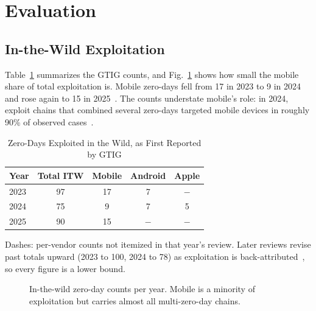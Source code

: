 \documentclass[conference,a4paper]{IEEEtran}
\begin{document}
\section{Evaluation}

\subsection{In-the-Wild Exploitation}
Table~\ref{tab:itw} summarizes the GTIG counts, and Fig.~\ref{fig:itw}
shows how small the mobile share of total exploitation is. Mobile
zero-days fell from 17 in 2023 to 9 in 2024 and rose again to 15 in
2025~\cite{gtig2023review, charrier2025zeroday, gtig2026review}. The
counts understate mobile's role: in 2024, exploit chains that combined
several zero-days targeted mobile devices in roughly 90\% of observed
cases~\cite{charrier2025zeroday}.

\begin{table}[htbp]
\caption{Zero-Days Exploited in the Wild, as First Reported by GTIG}
\begin{center}
\begin{tabular}{@{}lcccc@{}}
\toprule
\textbf{Year} & \textbf{Total ITW} & \textbf{Mobile} & \textbf{Android} & \textbf{Apple} \\
\midrule
2023 & 97 & 17 & 7 & $-$ \\
2024 & 75 & 9 & 7 & 5 \\
2025 & 90 & 15 & $-$ & $-$ \\
\bottomrule
\end{tabular}
\label{tab:itw}
\end{center}
\vspace{-2mm}
\footnotesize Dashes: per-vendor counts not itemized in that year's review. Later reviews revise past totals upward (2023 to 100, 2024 to 78) as exploitation is back-attributed~\cite{gtig2026review}, so every figure is a lower bound.
\end{table}

\begin{figure}[htbp]
\centering
{}
\caption{In-the-wild zero-day counts per year. Mobile is a minority of
exploitation but carries almost all multi-zero-day chains.}
\label{fig:itw}
\end{figure}
\end{document}
